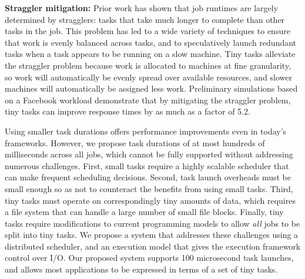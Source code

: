 \vspace{4pt}\noindent\textbf{Straggler mitigation:}
Prior work has shown that job runtimes are largely determined by
stragglers: tasks that take much longer to complete than other tasks in the
job. This problem has led to a wide variety of techniques to ensure that
work is evenly balanced across tasks, and to speculatively launch
redundant tasks when a task appears to be running on a slow machine.
Tiny tasks alleviate the straggler problem because work is allocated to
machines at fine granularity, so work will automatically be evenly spread
over available resources, and slower machines will automatically be assigned
less work. Preliminary simulations based on a Facebook workload
demonstrate that by mitigating the straggler problem, tiny tasks
can improve response times by as much as a factor of 5.2.


Using smaller task durations offers performance improvements even in
today's frameworks.  However, we propose task durations of at most
hundreds of milliseconds across all jobs, which cannot be fully supported without addressing
numerous challenges. First, small tasks require a highly scalable scheduler
that can make frequent scheduling decisions. Second,
task launch overheads must be small enough so as not to counteract the
benefits from using small tasks.
Third, tiny tasks must operate on correspondingly tiny amounts
of data, which requires a file system that can handle a large number of 
small file blocks. Finally, tiny tasks require modifications to current programming
models to allow \emph{all} jobs to be split into tiny tasks. We propose a system
that addresses these challenges using a distributed scheduler, and an execution model that gives the execution framework control
over I/O. Our proposed system supports
100 microsecond task launches, and allows most applications to be
expressed in terms of a set of tiny tasks.

